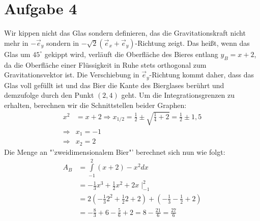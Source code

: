 \documentclass[10pt,a4paper,parskip=half]{scrartcl}
\begin{document}
\section*{Aufgabe 4}
Wir kippen nicht das Glas sondern definieren, das die Gravitationskraft nicht mehr in $-\vec e_y$ sondern in $-\sqrt 2 (\vec e_x + \vec e_y)$-Richtung zeigt. Das heißt, wenn das Glas um $45^{\circ}$ gekippt wird, verläuft die Oberfläche des Bieres entlang $y_B = x + 2$, da die Oberfläche einer Flüssigkeit in Ruhe stets orthogonal zum Gravitationsvektor ist. Die Verschiebung in $\vec e_y$-Richtung kommt daher, dass das Glas voll gefüllt ist und das Bier die Kante des Bierglases berührt und demzufolge durch den Punkt $(2,4)$ geht. Um die Integrationsgrenzen zu erhalten, berechnen wir die Schnittstellen beider Graphen:
\begin{align*}
x^2 &= x + 2 \Rightarrow x_{1/2} =  \frac 12 \pm \sqrt{ \frac 14 + 2} = \frac 12 \pm 1,5\\
\Rightarrow &x_1 = -1\\
\Rightarrow &x_2 = 2
\end{align*}
Die Menge an "'zweidimensionalem Bier"' berechnet sich nun wie folgt:
\begin{align*}
A_B &= \int\limits_{-1}^{2} (x+2) - x^2 dx\\
&= -\frac 13 x^3 + \frac 12 x^2 + 2x \mid_{-1}^{2}\\
&= 2\left(-\frac 13 2^2 + \frac 12 2 + 2\right) + \left(-\frac 13 -\frac 12 +2\right)\\
&= -\frac 83 + 6 - \frac 56 + 2 = 8 - \frac {21}6 = \frac {27}6
\end{align*}
\end{document}
